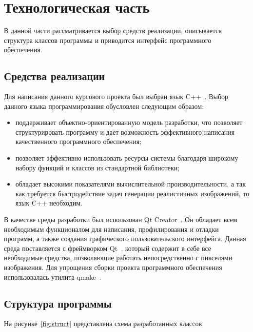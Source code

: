 \section{Технологическая часть}
В данной части рассматривается выбор средств реализации, описывается структура классов программы и приводится интерфейс программного обеспечения.

\subsection{Средства реализации}

Для написания данного курсового проекта был выбран язык C++~\cite{cpp-lang}.
Выбор данного языка программирования обусловлен следующим образом:
\begin{itemize}
	\item поддерживает объектно-ориентированную модель разработки, что позволяет структурировать программу и дает возможность эффективного написания качественного программного обеспечения;
	\item позволяет эффективно использовать ресурсы системы благодаря широкому набору функций и классов из стандартной библиотеки;
	\item обладает высокими показателями вычислительной производительности, а так как требуется быстродействие задач генерации реалистичных изображений, то язык C++ необходим.
\end{itemize}

В качестве среды разработки был использован Qt Creator~\cite{qt-creator}. 
Он обладает всем необходимым функционалом для написания, профилирования и отладки программ, а также создания графического пользовательского интерфейса.
Данная среда поставляется с фреймворком Qt~\cite{qt-framefork}, который содержит в себе все необходимые средства, позволяющие работать непосредственно с пикселями изображения.
Для упрощения сборки проекта программного обеспечения использовалась утилита qmake~\cite{qmake}.

\subsection{Структура программы}

На рисунке~\ref{fig:struct} представлена схема разработанных классов

